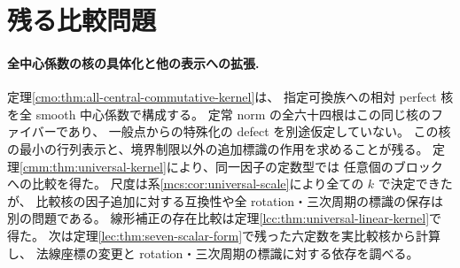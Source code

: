 \PaperReferenceGuide




























\section{残る比較問題}
\label{mix:sec:questions}

\paragraph{全中心係数の核の具体化と他の表示への拡張.}
定理\ref{cmo:thm:all-central-commutative-kernel}は、
指定可換族への相対 perfect 核を全 smooth 中心係数で構成する。
定常 norm の全六十四根はこの同じ核のファイバーであり、
一般点からの特殊化の defect を別途仮定していない。
この核の最小の行列表示と、境界制限以外の追加標識の作用を求めることが残る。
定理\ref{cmm:thm:universal-kernel}により、同一因子の定数型では
任意個のブロックへの比較を得た。
尺度は系\ref{mcs:cor:universal-scale}により全ての $k$ で決定できたが、
比較核の因子追加に対する互換性や全 rotation・三次周期の標識の保存は別の問題である。
線形補正の存在比較は定理\ref{lcc:thm:universal-linear-kernel}で得た。
次は定理\ref{lec:thm:seven-scalar-form}で残った六定数を実比較核から計算し、
法線座標の変更と rotation・三次周期の標識に対する依存を調べる。

